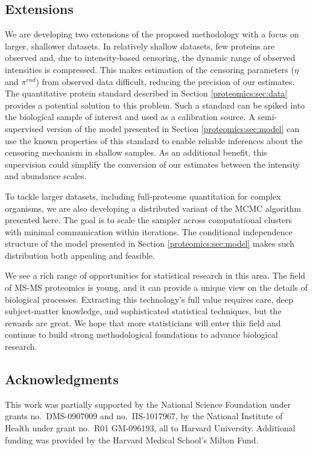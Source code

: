\subsection{Extensions}

We are developing two extensions of the proposed methodology with a focus on larger, shallower datasets.
In relatively shallow datasets, few proteins are observed and, due to intensity-based censoring, the dynamic range of observed intensities is compressed.
This makes estimation of the censoring parameters ($\eta$ and $\pi^{rnd}$) from observed data difficult, reducing the precision of our estimates.
The quantitative protein standard described in Section \ref{proteomics:sec:data} provides a potential solution to this problem.
Such a standard can be spiked into the biological sample of interest and used as a calibration source.
A semi-supervised version of the model presented in Section \ref{proteomics:sec:model} can use the known properties of this standard to enable reliable inferences about the censoring mechanism in shallow samples.
As an additional benefit, this supervision could simplify the conversion of our estimates between the intensity and abundance scales.

To tackle larger datasets, including full-proteome quantitation for complex organisms, we are also developing a distributed variant of the MCMC algorithm presented here.
The goal is to scale the sampler across computational clusters with minimal communication within iterations.
The conditional independence structure of the model presented in Section \ref{proteomics:sec:model} makes such distribution both appealing and feasible.

We see a rich range of opportunities for statistical research in this area.
The field of MS-MS proteomics is young, and it can provide a unique view on the details of biological processes.
Extracting this technology's full value requires care, deep subject-matter knowledge, and sophisticated statistical techniques, but the rewards are great.
We hope that more statisticians will enter this field and continue to build strong methodological foundations to advance biological research.


\subsection*{Acknowledgments}

This work was partially supported by the National Science Foundation under grants no.\ DMS-0907009 and no.\ IIS-1017967, by the National Institute of Health under grant no.\ R01 GM-096193, all to Harvard University. Additional funding was provided by the Harvard Medical School's Milton Fund.

